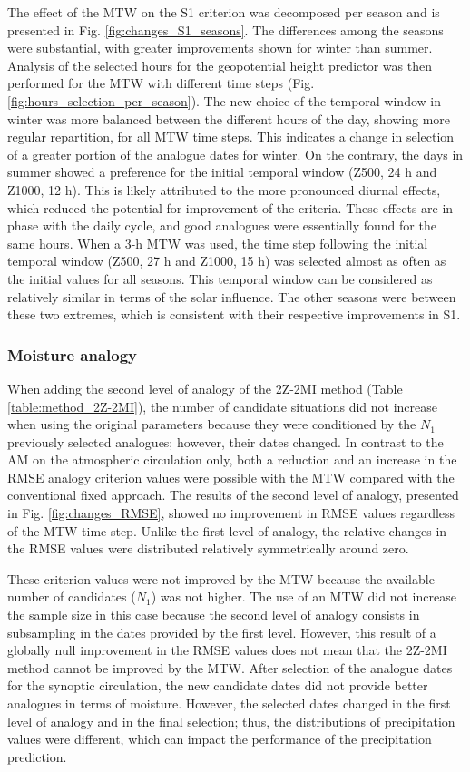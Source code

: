 \documentclass[hess, manuscript]{copernicus}
\begin{document}
	The effect of the MTW on the S1 criterion was decomposed per season and is presented in Fig. \ref{fig:changes_S1_seasons}. The differences among the seasons were substantial, with greater improvements shown for winter than summer. Analysis of the selected hours for the geopotential height predictor was then performed for the MTW with different time steps (Fig. \ref{fig:hours_selection_per_season}). The new choice of the temporal window in winter was more balanced between the different hours of the day, showing more regular repartition, for all MTW time steps. This indicates a change in selection of a greater portion of the analogue dates for winter. On the contrary, the days in summer showed a preference for the initial temporal window (Z500, 24 h and Z1000, 12 h). This is likely attributed to the more pronounced diurnal effects, which reduced the potential for improvement of the criteria. These effects are in phase with the daily cycle, and good analogues were essentially found for the same hours. When a 3-h MTW was used, the time step following the initial temporal window (Z500, 27 h and Z1000, 15 h) was selected almost as often as the initial values for all seasons. This temporal window can be considered as relatively similar in terms of the solar influence. The other seasons were between these two extremes, which is consistent with their respective improvements in S1.
	
	
	\subsubsection{Moisture analogy}
	\label{sec:changes_analogy_moisture}
	
	When adding the second level of analogy of the 2Z-2MI method (Table \ref{table:method_2Z-2MI}), the number of candidate situations did not increase when using the original parameters because they were conditioned by the $N_{1}$ previously selected analogues; however, their dates changed. In contrast to the AM on the atmospheric circulation only, both a reduction and an increase in the RMSE analogy criterion values were possible with the MTW compared with the conventional fixed approach. The results of the second level of analogy, presented in Fig. \ref{fig:changes_RMSE}, showed no improvement in RMSE values regardless of the MTW time step. Unlike the first level of analogy, the relative changes in the RMSE values were distributed relatively symmetrically around zero.
	
	These criterion values were not improved by the MTW because the available number of candidates ($N_{1}$) was not higher. The use of an MTW did not increase the sample size in this case because the second level of analogy consists in subsampling in the dates provided by the first level. However, this result of a globally null improvement in the RMSE values does not mean that the 2Z-2MI method cannot be improved by the MTW. After selection of the analogue dates for the synoptic circulation, the new candidate dates did not provide better analogues in terms of moisture. However, the selected dates changed in the first level of analogy and in the final selection; thus, the distributions of precipitation values were different, which can impact the performance of the precipitation prediction.
	
\end{document}

